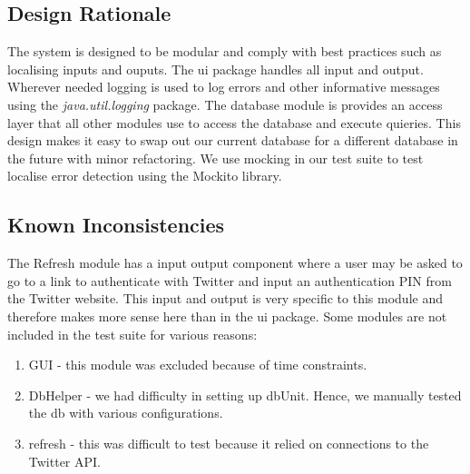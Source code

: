 \documentclass[a4paper, 12pt]{article}
\begin{document}
\subsection{Design Rationale} \label{sec:rationale}
\begin{adjustwidth}{2em}{0pt}
The system is designed to be modular and comply with best practices such as localising inputs and ouputs. The ui package handles all input and output. Wherever needed logging is used to log errors and other informative messages using the \textit{java.util.logging} package. The database module is provides an access layer that all other modules use to access the database and execute quieries. This design makes it easy to swap out our current database for a different database in the future with minor refactoring. We use mocking in our test suite to test localise error detection using the Mockito library.
\end{adjustwidth}

\subsection{Known Inconsistencies} \label{sec:known}
\begin{adjustwidth}{2em}{0pt}
The Refresh module has a input output component where a user may be asked to go to a link to authenticate with Twitter and input an authentication PIN from the Twitter website. This input and output is very specific to this module and therefore makes more sense here than in the ui package.
Some modules are not included in the test suite for various reasons: 
\begin{enumerate}
\item GUI - this module was excluded because of time constraints.
\item DbHelper - we had difficulty in setting up dbUnit. Hence, we manually tested the db with various configurations.
\item refresh - this was difficult to test because it relied on connections to the Twitter API.
\end{enumerate}
\end{adjustwidth}
\end{document}
